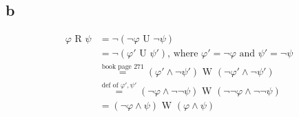 \documentclass[11pt]{article}
\begin{document}
\subsection{b}
\begin{align*}
	\varphi \text{ R } \psi &= \lnot(\lnot\varphi \text{ U } \lnot\psi)\\
		&= \lnot(\varphi' \text{ U } \psi')\text{, where } \varphi' = \lnot\varphi \text{ and } \psi' = \lnot\psi \\
		&\stackrel{\text{book page 271}}{=} (\varphi' \land \lnot\psi')\text{ W } (\lnot\varphi' \land \lnot\psi') \\
		&\stackrel{\text{def of }\varphi', \psi'}{=} (\lnot\varphi \land \lnot\lnot\psi)\text{ W } (\lnot\lnot\varphi \land \lnot\lnot\psi)\\
		&= (\lnot\varphi \land \psi)\text{ W } (\varphi \land \psi)
\end{align*}
\end{document}

